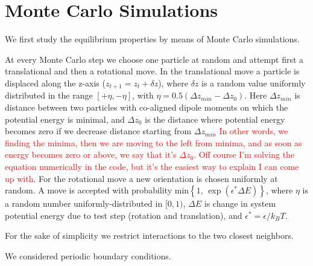 \section{Monte Carlo Simulations}

We first study the equilibrium properties by means of Monte Carlo simulations.

At every Monte Carlo step we choose one particle at random and attempt first a translational and then a rotational move. In the translational move a particle is displaced along the z-axis ($z_{t+1} = z_t + \delta z$), where $\delta z$ is a random value uniformly distributed in the range $[+\eta, -\eta]$, with $\eta = 0.5 (\Delta z_{min} - \Delta z_0)$. Here $\Delta z_{min}$ is distance between two particles with co-aligned dipole moments on which the potential energy is minimal, and $\Delta z_0$ is the distance where potential energy becomes zero if we decrease distance starting from $\Delta z_{min}$ \textcolor{red}{In other words, we finding the minima, then we are moving to the left from minima, and as soon as energy becomes zero or above, we say that it's $\Delta z_0$. Off course I'm solving the equation numerically in the code, but it's the easiest way to explain I can come up with}. For the rotational move a new orientation is chosen uniformly at random. A move is accepted with probability $ \mathrm{min} \left\{1, \, \exp(\epsilon^*\Delta E) \right\}$, where $\eta$ is a random number uniformly-distributed in $[0, 1)$, $\Delta E$ is change in system potential energy due to test step (rotation and translation), and $\epsilon^* = \epsilon/k_B T$.

For the sake of simplicity we restrict interactions to the two closest neighbors.

We considered periodic boundary conditions.
